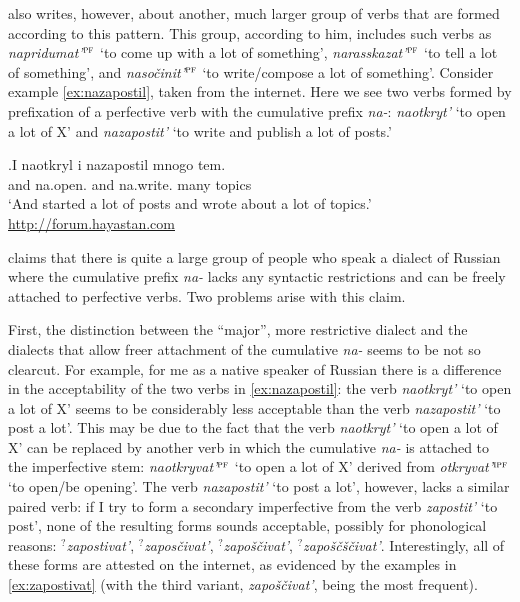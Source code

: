 \citeauthor{Tatevosov:13a} also writes, however, about another, much larger group of verbs that are formed according to this pattern. This group, according to him, includes such verbs as \textit{napridumat'}$^{\textsc{pf}}$ `to come up with a lot of something', \textit{narasskazat'}$^{\textsc{pf}}$ `to tell a lot of something', and \textit{naso\v{c}init'}$^{\textsc{pf}}$ `to write/compose a lot of something'. Consider example \ref{ex:nazapostil}, taken from the internet. Here we see two verbs formed by prefixation of a perfective verb with the cumulative prefix \textit{na-}: \textit{naotkryt'} `to open a lot of X' and \textit{nazapostit'} `to write and publish a lot of posts.'
 
\exg.\label{ex:nazapostil}I naotkryl i nazapostil mnogo tem.\\
and na.open. and {na.write.} {many} {topics}\\
\trans `And started a lot of posts and wrote about a lot of topics.'\\\hbox{}\hfill\hbox{\url{http://forum.hayastan.com}}

\citet{Tatevosov:13a} claims that there is quite a large group of people who speak a dialect of Russian where the cumulative prefix \textit{na-} lacks any syntactic restrictions and can be freely attached to perfective verbs. Two problems arise with this claim.

First, the distinction between the ``major'', more restrictive dialect and the dialects that allow freer attachment of the cumulative \textit{na-} seems to be not so clearcut. For example, for me as a native speaker of Russian there is a difference in the acceptability of the two verbs in \ref{ex:nazapostil}: the verb \textit{naotkryt'} `to open a lot of X' seems to be considerably less acceptable than the verb \textit{nazapostit'} `to post a lot'. This may be due to the fact that the verb \textit{naotkryt'} `to open a lot of X' can be replaced by another verb in which the cumulative \textit{na-} is attached to the imperfective stem: \textit{naotkryvat'}$^{\textsc{pf}}$ `to open a lot of X' derived from \textit{otkryvat'}$^{\textsc{ipf}}$ `to open/be opening'. The verb \textit{nazapostit'} `to post a lot', however, lacks a similar paired verb: if I try to form a secondary imperfective from the verb \textit{zapostit'} `to post', none of the resulting forms sounds acceptable, possibly for phonological reasons: $^?$\textit{zapostivat'}, $^?$\textit{zapos\v{c}ivat'}, $^?$\textit{zapo\v{s}\v{c}ivat'}, $^?$\textit{zapo\v{s}\v{c}\v{s}\v{c}ivat'}. Interestingly, all of these forms are attested on the internet, as evidenced by the examples in \ref{ex:zapostivat} (with the third variant, \textit{zapo\v{s}\v{c}ivat'}, being the most frequent).


